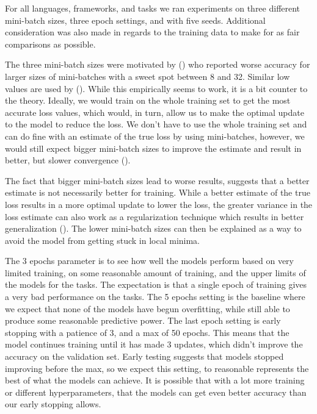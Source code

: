 For all languages, frameworks, and tasks we ran experiments on three different
mini-batch sizes, three epoch settings, and with five seeds. Additional
consideration was also made in regards to the training data to make for as fair
comparisons as possible.

The three mini-batch sizes were motivated by (\cite{reimers2017reporting}) who
reported worse accuracy for larger sizes of mini-batches with a sweet spot
between 8 and 32. Similar low values are used by (\cite{huang2015bidirectional}).
While this empirically seems to work, it is a bit counter to the theory. Ideally,
we would train on the whole training set to get the most accurate loss values,
which would, in turn, allow us to make the optimal update to the model to reduce
the loss. We don't have to use the whole training set and can do fine with an
estimate of the true loss by using mini-batches, however, we would still expect
bigger mini-batch sizes to improve the estimate and result in better, but slower
convergence (\cite[Chapter~8.1.3]{goodfellow2016deep}).

The fact that bigger mini-batch sizes lead to worse results, suggests that a
better estimate is not necessarily better for training. While a better estimate
of the true loss results in a more optimal update to lower the loss, the greater
variance in the loss estimate can also work as a regularization technique which
results in better generalization (\cite[pp.~279]{goodfellow2016deep}). The lower
mini-batch sizes can then be explained as a way to avoid the model from getting
stuck in local minima.

The 3 epochs parameter is to see how well the models perform based on very
limited training, on some reasonable amount of training, and the upper limits of
the models for the tasks. The expectation is that a single epoch of training
gives a very bad performance on the tasks. The 5 epochs setting is the baseline
where we expect that none of the models have begun overfitting, while still able
to produce some reasonable predictive power. The last epoch setting is early
stopping with a patience of 3, and a max of 50 epochs. This means that the model
continues training until it has made 3 updates, which didn't improve the
accuracy on the validation set. Early testing suggests that models stopped
improving before the max, so we expect this setting, to reasonable represents
the best of what the models can achieve. It is possible that with a lot more
training or different hyperparameters, that the models can get even better
accuracy than our early stopping allows.

